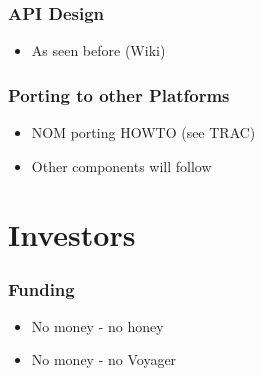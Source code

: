\documentclass[handout]{beamer}
\begin{document}
\begin{frame}
\frametitle{API Design}
\begin{itemize}
  \item As seen before (Wiki)
\end{itemize}
\end{frame}

\begin{frame}
\frametitle{Porting to other Platforms}
\begin{itemize}[<+->]
  \item NOM porting HOWTO (see TRAC)
  \item Other components will follow
\end{itemize}
\end{frame}


\section{Investors}

\begin{frame}
\frametitle{Funding}
\begin{itemize}[<+->]
  \item No money - no honey
  \item No money - no Voyager
\end{itemize}
\end{frame}
\end{document}
